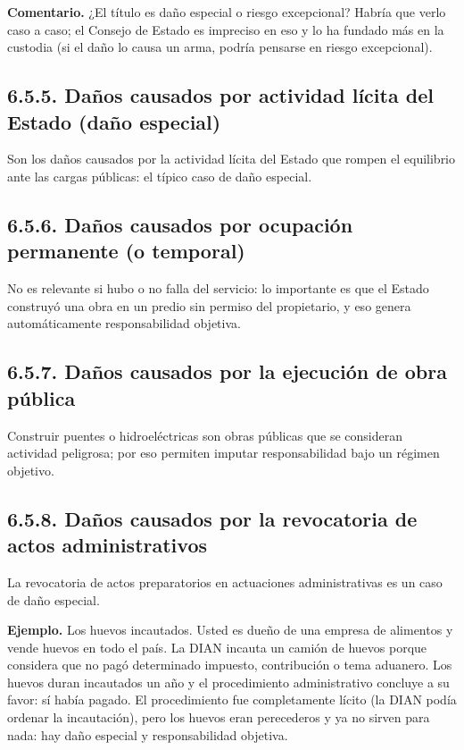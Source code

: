 \begin{comentario}
\textcolor[HTML]{8A6D3B}{\textbf{Comentario. }}¿El título es daño especial o riesgo excepcional? Habría que verlo caso a caso; el Consejo de Estado es impreciso en eso y lo ha fundado más en la custodia (si el daño lo causa un arma, podría pensarse en riesgo excepcional).
\end{comentario}
\subsection{6.5.5. Daños causados por actividad lícita del Estado (daño especial)}
Son los daños causados por la actividad lícita del Estado que rompen el equilibrio ante las cargas públicas: el típico caso de daño especial.

\subsection{6.5.6. Daños causados por ocupación permanente (o temporal)}
No es relevante si hubo o no falla del servicio: lo importante es que el Estado construyó una obra en un predio sin permiso del propietario, y eso genera automáticamente responsabilidad objetiva.

\subsection{6.5.7. Daños causados por la ejecución de obra pública}
Construir puentes o hidroeléctricas son obras públicas que se consideran actividad peligrosa; por eso permiten imputar responsabilidad bajo un régimen objetivo.

\subsection{6.5.8. Daños causados por la revocatoria de actos administrativos}
La revocatoria de actos preparatorios en actuaciones administrativas es un caso de daño especial.

\begin{ejemplo}
\textcolor[HTML]{4F6228}{\textbf{Ejemplo. }}Los huevos incautados. Usted es dueño de una empresa de alimentos y vende huevos en todo el país. La DIAN incauta un camión de huevos porque considera que no pagó determinado impuesto, contribución o tema aduanero. Los huevos duran incautados un año y el procedimiento administrativo concluye a su favor: sí había pagado. El procedimiento fue completamente lícito (la DIAN podía ordenar la incautación), pero los huevos eran perecederos y ya no sirven para nada: hay daño especial y responsabilidad objetiva.
\end{ejemplo}
